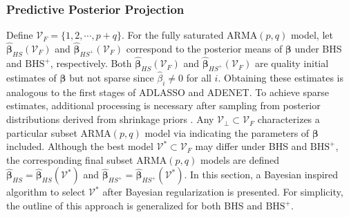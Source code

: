 \subsubsection{Predictive Posterior Projection}

Define $\mathcal{V}_F=\{1,2,\cdots,p+q\}$. For the fully saturated ARMA$(p,q)$ model, let $\hat{\bm{\beta}}_{HS}(\mathcal{V}_F)$ and $\hat{\bm{\beta}}_{HS^{+}}(\mathcal{V}_F)$ correspond to the posterior means of $\bm{\beta}$ under BHS and $\textrm{BHS}^+$, respectively. Both $\hat{\bm{\beta}}_{HS}(\mathcal{V}_F)$ and $\hat{\bm{\beta}}_{HS^{+}}(\mathcal{V}_F)$ are quality initial estimates of $\bm{\beta}$ but not sparse since $\hat{\beta}_i \neq 0$ for all $i$. Obtaining these estimates is analogous to the first stages of ADLASSO and ADENET. To achieve sparse estimates, additional processing is necessary after sampling from posterior distributions derived from shrinkage priors \citep{Hahn2015}. Any $\mathcal{V}_\perp \subset \mathcal{V}_F$ characterizes a particular subset ARMA$(p,q)$ model via indicating the parameters of $\bm{\beta}$ included.  Although the best model $\mathcal{V}^* \subset \mathcal{V}_F$ may differ under BHS and $\textrm{BHS}^+$, the corresponding final subset ARMA$(p,q)$ models are defined $\hat{\bm{\beta}}_{HS}=\hat{\bm{\beta}}_{HS}(\mathcal{V}^*)$ and $\hat{\bm{\beta}}_{HS^{+}}=\hat{\bm{\beta}}_{HS^{+}}(\mathcal{V}^*)$. In this section, a Bayesian inspired algorithm to select $\mathcal{V}^*$ after Bayesian regularization is presented. For simplicity, the outline of this approach is generalized for both BHS and $\textrm{BHS}^+$.

